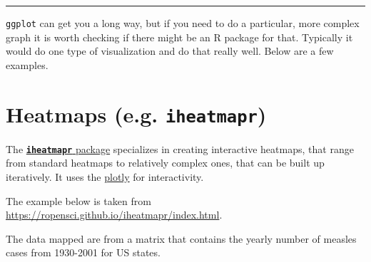 \documentclass[]{book}
\theoremstyle{definition}
\theoremstyle{definition}
\theoremstyle{definition}
\theoremstyle{remark}
\begin{document}
\begin{center}\rule{0.5\linewidth}{\linethickness}\end{center}

\texttt{ggplot} can get you a long way, but if you need to do a
particular, more complex graph it is worth checking if there might be an
R package for that. Typically it would do one type of visualization and
do that really well. Below are a few examples.

\section{\texorpdfstring{Heatmaps (e.g.
\textbf{\texttt{iheatmapr}})}{Heatmaps (e.g. iheatmapr)}}\label{heatmaps-e.g.-iheatmapr}

The
\href{https://CRAN.R-project.org/package=iheatmapr}{\textbf{\texttt{iheatmapr}}
package} specializes in creating interactive heatmaps, that range from
standard heatmaps to relatively complex ones, that can be built up
iteratively. It uses the \href{https://plot.ly/}{plotly} for
interactivity.

The example below is taken from
\url{https://ropensci.github.io/iheatmapr/index.html}.

The data mapped are from a matrix that contains the yearly number of
measles cases from 1930-2001 for US states.
\end{document}
